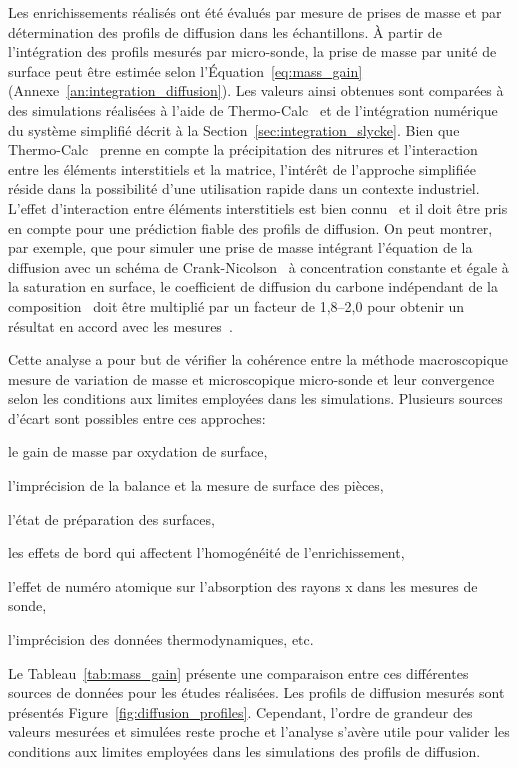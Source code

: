 Les enrichissements réalisés ont été évalués par mesure de prises de masse et par détermination des profils de diffusion dans les échantillons. À partir de l'intégration des profils mesurés par micro-sonde, la prise de masse par unité de surface peut être estimée selon l'Équation~\ref{eq:mass_gain} (Annexe~\ref{an:integration_diffusion}). Les valeurs ainsi obtenues sont comparées à des simulations réalisées à l'aide de Thermo-Calc~\cite{Andersson2002,Borgenstam2000} et de l'intégration numérique du système simplifié  décrit à la Section~\ref{sec:integration_slycke}. Bien que Thermo-Calc~\cite{Andersson2002,Borgenstam2000} prenne en compte la précipitation des nitrures et l'interaction entre les éléments interstitiels et la matrice, l'intérêt de l'approche simplifiée réside dans la possibilité d'une utilisation rapide dans un contexte industriel. L'effet d'interaction entre éléments interstitiels est bien connu~\cite{Bhadeshia1980,Bhadeshia2004,Oda1994,Sozinov1997225,Sozinov1999927} et il doit être pris en compte pour une prédiction fiable des profils de diffusion. On peut montrer, par exemple, que pour simuler une prise de masse intégrant l'équation de la diffusion avec un schéma de Crank-Nicolson~\cite{CrankNicolson1947} à concentration constante et égale à la saturation en surface, le coefficient de diffusion du carbone indépendant de la composition~\cite{Slycke1981ii} doit être multiplié par un facteur de 1,8--2,0 pour obtenir un résultat en accord avec les mesures~\cite{Bhadeshia2004}.

Cette analyse a pour but de vérifier la cohérence entre la méthode macroscopique \textendash{} mesure de variation de masse \textendash{} et microscopique \textendash{} micro-sonde \textendash{} et leur convergence selon les conditions aux limites employées dans les simulations. Plusieurs sources d'écart sont possibles entre ces approches: \begin{inparaenum}[(i)] \item le gain de masse par oxydation de surface, \item l'imprécision de la balance et la mesure de surface des pièces, \item l'état de préparation des surfaces, \item les effets de bord qui affectent l'homogénéité de l'enrichissement, \item l'effet de numéro atomique sur l'absorption des rayons x dans les mesures de sonde, \item l'imprécision des données thermodynamiques, etc. \end{inparaenum} Le Tableau~\ref{tab:mass_gain} présente une comparaison entre ces différentes sources de données pour les études réalisées. Les profils de diffusion mesurés sont présentés Figure~\ref{fig:diffusion_profiles}. Cependant, l'ordre de grandeur des valeurs \og{}mesurées\fg{} et simulées reste proche et l'analyse s'avère utile pour valider les conditions aux limites employées dans les simulations des profils de diffusion.

